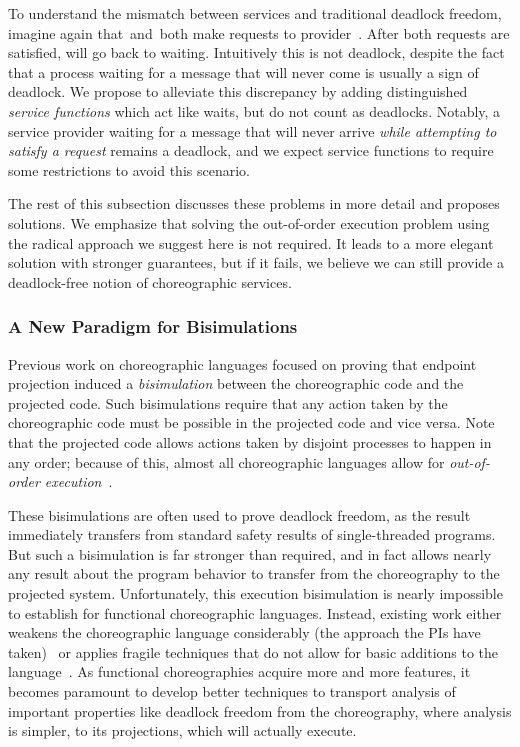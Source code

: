 To understand the mismatch between services and traditional deadlock freedom, imagine again that~\Alice and~\Bob both make requests to provider~\Server.
After both requests are satisfied, \Server{} will go back to waiting.
Intuitively this is not deadlock, despite the fact that a process waiting for a message that will never come is usually a sign of deadlock.
We propose to alleviate this discrepancy by adding distinguished \emph{service functions} which act like waits, but do not count as deadlocks.
Notably, a service provider waiting for a message that will never arrive \emph{while attempting to satisfy a request}
remains a deadlock, and we expect service functions to require some restrictions to avoid this scenario.

The rest of this subsection discusses these problems in more detail and proposes solutions.
We emphasize that solving the out-of-order execution problem using the radical approach we suggest here is not required.
It leads to a more elegant solution with stronger guarantees, but if it fails, we believe we can still provide a deadlock-free notion of choreographic services.

\subsubsection{A New Paradigm for Bisimulations}
\label{sec:new-parad-bisim}

Previous work on choreographic languages focused on proving that endpoint projection induced a \emph{bisimulation} between the choreographic code and the projected code.
Such bisimulations require that any action taken by the choreographic code must be possible in the projected code and vice versa.
Note that the projected code allows actions taken by disjoint processes to happen in any order; because of this, almost all choreographic languages allow for \emph{out-of-order execution}~\cite{Montesi23,HirschG22,Cruz-FilipeM17}.

These bisimulations are often used to prove deadlock freedom, as the result immediately transfers from standard safety results of single-threaded programs.
But such a bisimulation is far stronger than required, and in fact allows nearly any result about the program behavior to transfer from the choreography to the projected system.
Unfortunately, this execution bisimulation is nearly impossible to establish for functional choreographic languages.
Instead, existing work either weakens the choreographic language considerably (the approach the PIs have taken)~\cite{HirschG22,SamuelsonHC25} or applies fragile techniques that do not allow for basic additions to the language~\cite{CruzFilipeGLMP23}.
As functional choreographies acquire more and more features, it becomes paramount to develop better techniques
to transport analysis of important properties like deadlock freedom from the choreography, where analysis is simpler,
to its projections, which will actually execute.

